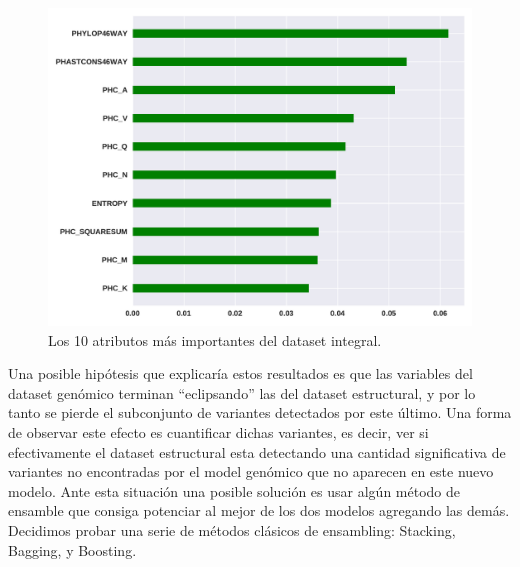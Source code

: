 \begin{figure}[H]
    \centering
    \includegraphics[scale=0.55]{documents/latex/figures/3/importance_3.pdf}
    \caption{Los 10 atributos más importantes del dataset integral.}
    \label{fig:importance_3}
\end{figure}
Una posible hipótesis que explicaría estos resultados es que las variables del dataset genómico terminan ``eclipsando'' las del dataset estructural, y por lo tanto se pierde el subconjunto de variantes detectados por este último. Una forma de observar este efecto es cuantificar dichas variantes, es decir, ver si efectivamente el dataset estructural esta detectando una cantidad significativa de variantes no encontradas por el model genómico que no aparecen en este nuevo modelo.  Ante esta situación una posible solución es usar algún método de ensamble que consiga potenciar al mejor de los dos modelos agregando las demás. Decidimos probar una serie de métodos clásicos de ensambling: Stacking, Bagging, y Boosting.






